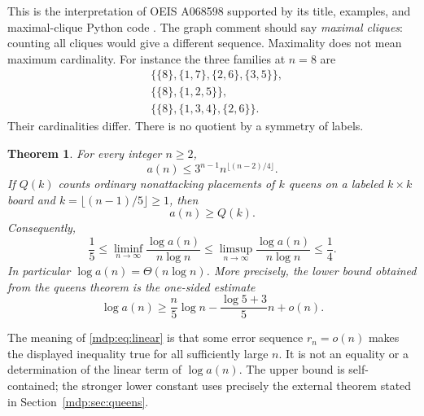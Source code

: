 \documentclass[11pt,letterpaper]{article}
\numberwithin{equation}{section}
\newtheorem{theorem}{Theorem}[section]
\theoremstyle{remark}\newtheorem{remark}[theorem]{Remark}
\begin{document}
This is the interpretation of OEIS A068598 supported by its title,
examples, and maximal-clique Python code \cite{oeis}. The graph comment
should say \emph{maximal cliques}: counting all cliques would give a
different sequence. Maximality does not mean maximum cardinality.
For instance the three families at $n=8$ are
\[
\begin{split}
 &\{\{8\},\{1,7\},\{2,6\},\{3,5\}\},\\
 &\{\{8\},\{1,2,5\}\},\\
 &\{\{8\},\{1,3,4\},\{2,6\}\}.
\end{split}
\]
Their cardinalities differ. There is no quotient by a symmetry of labels.

\begin{theorem}\label{mdp:thm:main}
For every integer $n\ge2$,
\begin{equation}\label{mdp:eq:upper}
 a(n)\le 3^{n-1}n^{\lfloor(n-2)/4\rfloor}.
\end{equation}
If $Q(k)$ counts ordinary nonattacking placements of $k$ queens on a
labeled $k\times k$ board and $k=\lfloor(n-1)/5\rfloor\ge1$, then
\begin{equation}\label{mdp:eq:lowerfinite}
 a(n)\ge Q(k).
\end{equation}
Consequently,
\begin{equation}\label{mdp:eq:logbounds}
 \frac15\le\liminf_{n\to\infty}\frac{\log a(n)}{n\log n}
 \le\limsup_{n\to\infty}\frac{\log a(n)}{n\log n}\le\frac14.
\end{equation}
In particular $\log a(n)=\Theta(n\log n)$. More precisely, the lower
bound obtained from the queens theorem is the one-sided estimate
\begin{equation}\label{mdp:eq:linear}
 \log a(n)\ge \frac n5\log n-\frac{\log5+3}{5}n+o(n).
\end{equation}
\end{theorem}
The meaning of \eqref{mdp:eq:linear} is that some error sequence $r_n=o(n)$
makes the displayed inequality true for all sufficiently large $n$.
It is not an equality or a determination of the linear term of
$\log a(n)$. The upper bound is self-contained; the stronger lower
constant uses precisely the external theorem stated in Section~\ref{mdp:sec:queens}.
\end{document}
